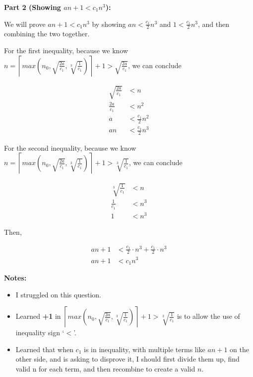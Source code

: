\documentclass[12pt]{article}
\begin{document}
\begin{itemize}
    \textbf{Part 2 (Showing $an+1 < c_1n^3$):}

    \bigskip

    We will prove $an +1 < c_1n^3$ by showing $an < \frac{c_1}{2}n^3$ and
    $1 < \frac{c_1}{2}n^3$, and then combining the two together.

    \bigskip

    For the first inequality, because we know $n = \left\lceil max(n_0,
    \sqrt{\frac{2a}{c_1}}, \sqrt[3]{\frac{1}{c_1}}) \right\rceil + 1 > \sqrt{\frac{2a}{c_1}}$,
    we can conclude

    \begin{align}
        \sqrt{\frac{2a}{c_1}} &< n\\
        \frac{2a}{c_1} &< n^2\\
        a &< \frac{c_1}{2}n^2\\
        an &< \frac{c_1}{2}n^3
    \end{align}

    \bigskip

    For the second inequality, because we know $n = \left\lceil max(n_0,
    \sqrt{\frac{2a}{c_1}}, \sqrt[3]{\frac{1}{c_1}}) \right\rceil + 1 > \sqrt[3]{\frac{1}{c_1}}$,
    we can conclude

    \begin{align}
        \sqrt[3]{\frac{1}{c_1}} &< n\\
        \frac{1}{c_1} &< n^3\\
        1 &< n^3
    \end{align}

    \bigskip

    Then,

    \begin{align}
        an +1 &< \frac{c_1}{2} \cdot n^3 + \frac{c_1}{2} \cdot n^3\\
        an + 1 &< c_1n^3
    \end{align}

    \bigskip

    \textbf{Notes:}

    \begin{itemize}
        \item I struggled on this question.
        \item Learned \textbf{+1} in $\left\lceil max(n_0, \sqrt{\frac{2a}{c_1}},
        \sqrt[3]{\frac{1}{c_1}}) \right\rceil + 1 > \sqrt[3]{\frac{1}{c_1}}$ is
        to allow the use of inequality sign `$<$'.
        \item Learned that when $c_1$ is in inequality, with multiple terms like
        $an + 1$ on the other side, and is asking to disprove it, I should first
        divide them up, find valid n for each term, and then recombine
        to create a valid $n$.


\end{itemize}
\end{itemize}
\end{document}
